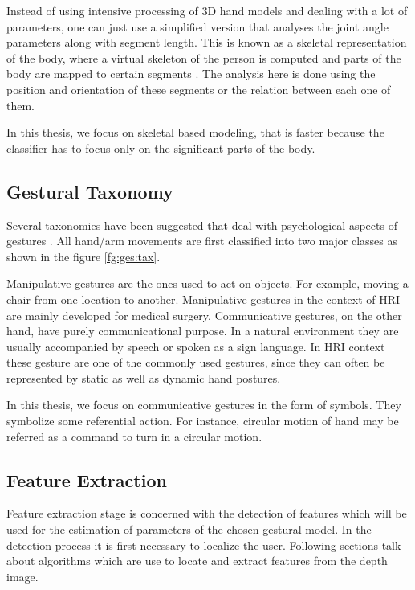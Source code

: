 Instead of using intensive processing of 3D hand models and dealing with a lot of parameters, one can just use a simplified version that analyses the joint angle parameters along with segment length. This is known as a skeletal representation of the body, where a virtual skeleton of the person is computed and parts of the body are mapped to certain segments \cite{2}. The analysis here is done using the position and orientation of these segments or the relation between each one of them.

In this thesis, we focus on skeletal based modeling, that is faster because the classifier has to focus only on the significant parts of the body.

\subsection{Gestural Taxonomy} Several taxonomies have been suggested that deal with psychological aspects of gestures \cite{2}. All hand/arm movements are first classified into two major classes as shown in the figure \ref{fg:ges:tax}.



Manipulative gestures are the ones used to act on objects. For example, moving a chair from one location to another. Manipulative gestures in the context of HRI are mainly developed for medical surgery. Communicative gestures, on the other hand, have purely communicational purpose. In a natural environment they are usually accompanied by speech or spoken as a sign language. In HRI context these gesture are one of the commonly used gestures, since they can often be represented by static as well as dynamic hand postures.

In this thesis, we focus on communicative gestures in the form of symbols. They symbolize some referential action. For instance, circular motion of hand may be referred as a command to turn in a circular motion.

\subsection{Feature Extraction} Feature extraction stage is concerned with the detection of features which will be used for the estimation of parameters of the chosen gestural model. In the detection process it is first necessary to localize the user. Following sections talk about algorithms which are use to locate and extract features from the depth image.

